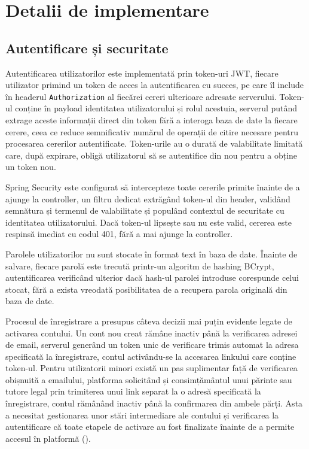 \chapter{Detalii de implementare}

\section{Autentificare și securitate}
Autentificarea utilizatorilor este implementată prin token-uri JWT, fiecare utilizator primind un token de acces la autentificarea cu succes, pe care îl include în headerul \texttt{Authorization} al fiecărei cereri ulterioare adresate serverului. Token-ul conține în payload identitatea utilizatorului și rolul acestuia, serverul putând extrage aceste informații direct din token fără a interoga baza de date la fiecare cerere, ceea ce reduce semnificativ numărul de operații de citire necesare pentru procesarea cererilor autentificate. Token-urile au o durată de valabilitate limitată care, după expirare, obligă utilizatorul să se autentifice din nou pentru a obține un token nou.

Spring Security este configurat să intercepteze toate cererile primite înainte de a ajunge la controller, un filtru dedicat extrăgând token-ul din header, validând semnătura și termenul de valabilitate și populând contextul de securitate cu identitatea utilizatorului. Dacă token-ul lipsește sau nu este valid, cererea este respinsă imediat cu codul 401, fără a mai ajunge la controller.

Parolele utilizatorilor nu sunt stocate în format text în baza de date. Înainte de salvare, fiecare parolă este trecută printr-un algoritm de hashing BCrypt, autentificarea verificând ulterior dacă hash-ul parolei introduse corespunde celui stocat, fără a exista vreodată posibilitatea de a recupera parola originală din baza de date.

Procesul de înregistrare a presupus câteva decizii mai puțin evidente legate de activarea contului. Un cont nou creat rămâne inactiv până la verificarea adresei de email, serverul generând un token unic de verificare trimis automat la adresa specificată la înregistrare, contul activându-se la accesarea linkului care conține token-ul. Pentru utilizatorii minori există un pas suplimentar față de verificarea obișnuită a emailului, platforma solicitând și consimțământul unui părinte sau tutore legal prin trimiterea unui link separat la o adresă specificată la înregistrare, contul rămânând inactiv până la confirmarea din ambele părți. Asta a necesitat gestionarea unor stări intermediare ale contului și verificarea la autentificare că toate etapele de activare au fost finalizate înainte de a permite accesul în platformă ().

